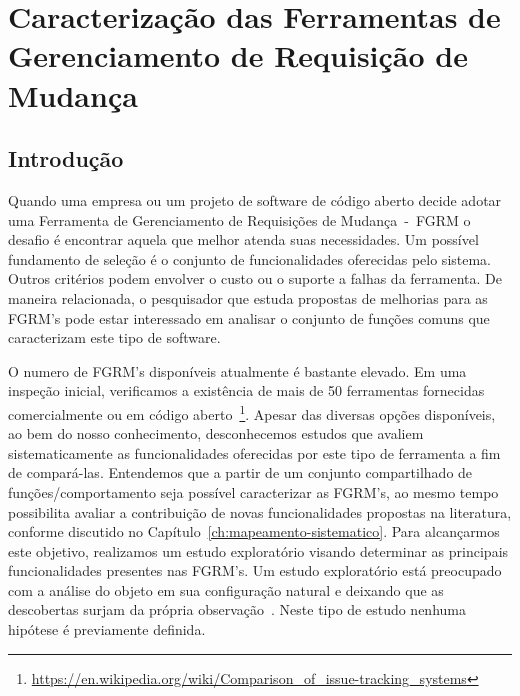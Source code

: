 \chapter{Caracterização das Ferramentas de Gerenciamento de Requisição de
	Mudança}
\label{ch:caracterizacao_ferramentas}

\section{Introdução}
\label{sec:caracterizacao_intro}
Quando uma empresa ou um projeto de software de código aberto decide adotar uma
Ferramenta de Gerenciamento de Requisições de Mudança~-~FGRM o desafio é
encontrar aquela que melhor atenda suas necessidades. Um possível fundamento de
seleção é o conjunto de funcionalidades oferecidas pelo sistema. Outros
critérios podem envolver o custo ou o suporte a falhas da ferramenta. De
maneira relacionada, o pesquisador que estuda propostas de melhorias para as
FGRM's pode estar interessado em analisar o conjunto de funções comuns que
caracterizam este tipo de software.

O numero de FGRM's disponíveis atualmente é bastante elevado. Em uma inspeção
inicial, verificamos a existência de mais de 50 ferramentas fornecidas
comercialmente ou em código
aberto~\footnote{\url{https://en.wikipedia.org/wiki/Comparison_of_issue-tracking_systems}}.
Apesar das diversas opções disponíveis, ao bem do nosso conhecimento,
desconhecemos estudos que avaliem sistematicamente as funcionalidades oferecidas
por este tipo de ferramenta a fim de compará-las. Entendemos que a partir de um
conjunto compartilhado de funções/comportamento seja possível caracterizar as
FGRM's, ao mesmo tempo possibilita avaliar a contribuição de novas
funcionalidades propostas na literatura, conforme discutido no
Capítulo~\ref{ch:mapeamento-sistematico}. Para alcançarmos este objetivo,
realizamos um estudo exploratório visando determinar as principais
funcionalidades presentes nas FGRM's. Um estudo exploratório está preocupado com
a análise do objeto em sua configuração natural e deixando que as descobertas
surjam da própria observação~\cite{wohlin2012experimentation}. Neste tipo de
estudo nenhuma hipótese é previamente definida.


